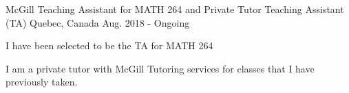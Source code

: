 \newpage

\begin{cventries}
  \cventry
    {McGill Teaching Assistant for MATH 264 and Private Tutor}
    {Teaching Assistant (TA)}
    {Quebec, Canada}
    {Aug. 2018 - Ongoing}
    {
      \begin{cvitems}
        \item {I have been selected to be the TA for MATH 264}
        \item {I am a private tutor with McGill Tutoring services for classes that I have previously taken.}
      \end{cvitems}
    }
\end{cventries}
